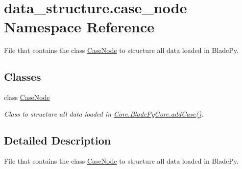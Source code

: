 \hypertarget{namespacedata__structure_1_1case__node}{}\section{data\+\_\+structure.\+case\+\_\+node Namespace Reference}
\label{namespacedata__structure_1_1case__node}


File that contains the class \hyperlink{classdata__structure_1_1case__node_1_1_case_node}{Case\+Node} to structure all data loaded in Blade\+Py.  


\subsection*{Classes}
\begin{DoxyCompactItemize}
\item 
class \hyperlink{classdata__structure_1_1case__node_1_1_case_node}{Case\+Node}
\begin{DoxyCompactList}\small\item\em Class to structure all data loaded in \hyperlink{class_core_1_1_blade_py_core_a1a62f9b5b8f5929bdb6f0a8c27049d9e}{Core.\+Blade\+Py\+Core.\+add\+Case()}. \end{DoxyCompactList}\end{DoxyCompactItemize}


\subsection{Detailed Description}
File that contains the class \hyperlink{classdata__structure_1_1case__node_1_1_case_node}{Case\+Node} to structure all data loaded in Blade\+Py. 